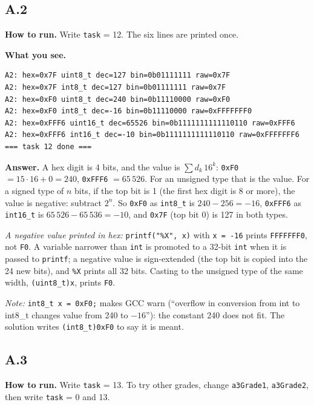 \documentclass[11pt,a4paper]{article}
\newcommand{\lv}[1]{\texttt{#1}}                 %
\newcommand{\run}[1]{\textbf{How to run.} #1}
\newcommand{\see}[1]{\textbf{What you see.} #1}
\begin{document}
\subsection*{A.2}
\run{Write \lv{task} = 12. The six lines are printed once.}

\see{}
\begin{lstlisting}[language={},basicstyle=\ttfamily\scriptsize]
A2: hex=0x7F uint8_t dec=127 bin=0b01111111 raw=0x7F
A2: hex=0x7F int8_t dec=127 bin=0b01111111 raw=0x7F
A2: hex=0xF0 uint8_t dec=240 bin=0b11110000 raw=0xF0
A2: hex=0xF0 int8_t dec=-16 bin=0b11110000 raw=0xFFFFFFF0
A2: hex=0xFFF6 uint16_t dec=65526 bin=0b1111111111110110 raw=0xFFF6
A2: hex=0xFFF6 int16_t dec=-10 bin=0b1111111111110110 raw=0xFFFFFFF6
=== task 12 done ===
\end{lstlisting}

\textbf{Answer.} A hex digit is 4 bits, and the value is $\sum d_k\,16^k$: \texttt{0xF0} $= 15 \cdot 16 + 0 = 240$,
\texttt{0xFFF6} $= 65\,526$. For an unsigned type that is the value. For a signed type of $n$ bits, if the top bit is
1 (the first hex digit is 8 or more), the value is negative: subtract $2^n$. So \texttt{0xF0} as \texttt{int8\_t} is
$240 - 256 = -16$, \texttt{0xFFF6} as \texttt{int16\_t} is $65\,526 - 65\,536 = -10$, and \texttt{0x7F} (top bit 0)
is 127 in both types.

\emph{A negative value printed in hex:} \texttt{printf("\%X", x)} with \texttt{x = -16} prints \texttt{FFFFFFF0}, not
\texttt{F0}. A variable narrower than \texttt{int} is promoted to a 32-bit \texttt{int} when it is passed to
\texttt{printf}; a negative value is sign-extended (the top bit is copied into the 24 new bits), and \texttt{\%X}
prints all 32 bits. Casting to the unsigned type of the same width, \texttt{(uint8\_t)x}, prints \texttt{F0}.

\emph{Note:} \texttt{int8\_t x = 0xF0;} makes GCC warn (``overflow in conversion from int to int8\_t changes value
from 240 to $-16$''): the constant 240 does not fit. The solution writes \texttt{(int8\_t)0xF0} to say it is meant.

\subsection*{A.3}
\run{Write \lv{task} = 13. To try other grades, change \lv{a3Grade1},
\lv{a3Grade2}, then write \lv{task} = 0 and 13.}
\end{document}
